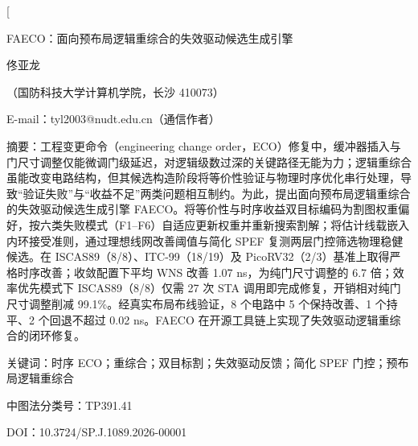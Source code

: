 \documentclass[twocolumn,10pt]{ctexart}
\let\songti\songfamily\let\heiti\heifamily\let\fangsong\fangfamily
\begin{document}
\pagestyle{plain}

\twocolumn[
\begin{center}
{\heiti{} FAECO：面向预布局逻辑重综合的失效驱动候选生成引擎}\par
\vspace{6pt}
{\fangsong{} 佟亚龙}\par
\vspace{4pt}
{\songti\fontsize{8}{12}\selectfont（国防科技大学计算机学院，长沙 410073）}\par\vspace{2pt}
{\songti\fontsize{8}{12}\selectfont E-mail：tyl2003@nudt.edu.cn（通信作者）}\par
\vspace{8pt}
\end{center}
\begin{flushleft}
{\heiti\fontsize{8.5}{13}\selectfont 摘\quad 要：}{\songti\fontsize{8.5}{13}\selectfont 工程变更命令（engineering change order，ECO）修复中，缓冲器插入与门尺寸调整仅能微调门级延迟，对逻辑级数过深的关键路径无能为力；逻辑重综合虽能改变电路结构，但其候选构造阶段将等价性验证与物理时序优化串行处理，导致“验证失败”与“收益不足”两类问题相互制约。为此，提出面向预布局逻辑重综合的失效驱动候选生成引擎 FAECO。将等价性与时序收益双目标编码为割图权重偏好，按六类失败模式（F1--F6）自适应更新权重并重新搜索割解；将估计线载嵌入内环接受准则，通过理想线网改善阈值与简化 SPEF 复测两层门控筛选物理稳健候选。在 ISCAS89（8/8）、ITC-99（18/19）及 PicoRV32（2/3）基准上取得严格时序改善；收敛配置下平均 WNS 改善 1.07 ns，为纯门尺寸调整的 6.7 倍；效率优先模式下 ISCAS89（8/8）仅需 27 次 STA 调用即完成修复，开销相对纯门尺寸调整削减 99.1\%。经真实布局布线验证，8 个电路中 5 个保持改善、1 个持平、2 个回退不超过 0.02 ns。FAECO 在开源工具链上实现了失效驱动逻辑重综合的闭环修复。}
\par
\vspace{4pt}
{\heiti\fontsize{8.5}{13}\selectfont 关键词：}{\songti\fontsize{8.5}{13}\selectfont 时序 ECO；重综合；双目标割；失效驱动反馈；简化 SPEF 门控；预布局逻辑重综合}\par
\vspace{2pt}
{\songti\fontsize{8.5}{13}\selectfont 中图法分类号：TP391.41}\par
\vspace{2pt}
{\songti\fontsize{8.5}{13}\selectfont DOI：10.3724/SP.J.1089.2026-00001}
\end{flushleft}
\end{document}
